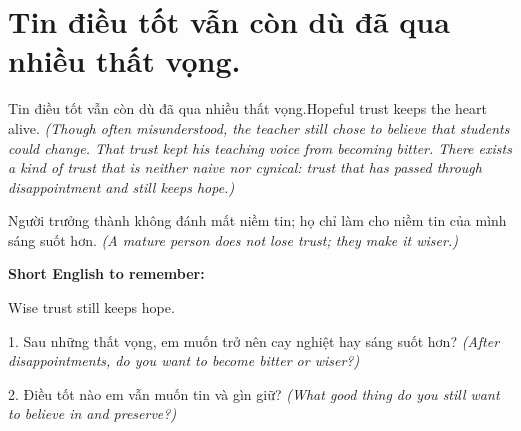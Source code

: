 \section{Tin điều tốt vẫn còn dù đã qua nhiều thất vọng.}
\begin{truyen}{Tin điều tốt vẫn còn dù đã qua nhiều thất vọng.}{Hopeful trust keeps the heart alive.}
\textit{(Though often misunderstood, the teacher still chose to believe that students could change. That trust kept his teaching voice from becoming bitter. There exists a kind of trust that is neither naive nor cynical: trust that has passed through disappointment and still keeps hope.)}
\end{truyen}
\begin{baihoc}
Người trưởng thành không đánh mất niềm tin; họ chỉ làm cho niềm tin của mình sáng suốt hơn.
\textit{(A mature person does not lose trust; they make it wiser.)}
\end{baihoc}
\begin{ghinhoanh}
\textbf{Short English to remember:}

Wise trust still keeps hope.
\end{ghinhoanh}
\begin{tuhocnhanh}
1. Sau những thất vọng, em muốn trở nên cay nghiệt hay sáng suốt hơn? \textit{(After disappointments, do you want to become bitter or wiser?)}

2. Điều tốt nào em vẫn muốn tin và gìn giữ? \textit{(What good thing do you still want to believe in and preserve?)}
\end{tuhocnhanh}
\ngancach
